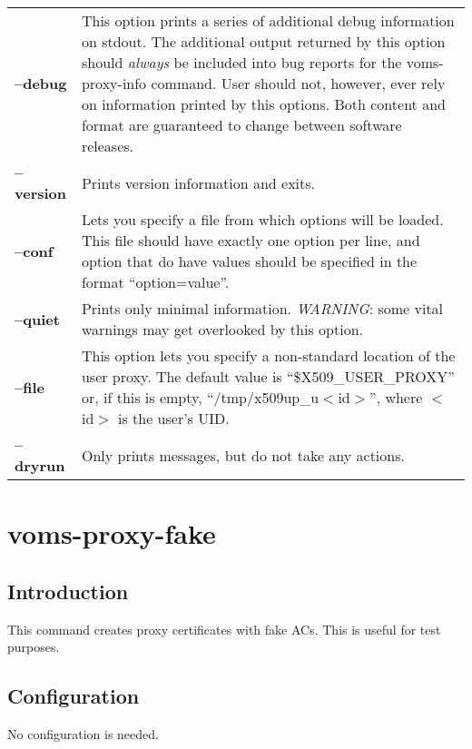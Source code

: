 \documentclass[a4paper]{book}
\begin{document}
\begin{longtable}{lp{3in}}
\textbf{--debug}    & This option prints a series of additional debug
		      information on stdout.  The additional output
		      returned by this option should \emph{always} be
		      included into bug reports for the
		      voms-proxy-info command.  User should not,
		      however, ever rely on information printed by
		      this options.  Both content and format are
		      guaranteed to change between software
		      releases.\\
\textbf{--version}  & Prints version information and exits.\\
\textbf{--conf}     & Lets you specify a file from which options will
		      be loaded.  This file should have exactly one
		      option per line, and option that do have values
		      should be specified in the format
		      ``option=value''.\\ 
\textbf{--quiet}    & Prints only minimal information.
		      \emph{WARNING}: some vital warnings may get
		      overlooked by this option.\\
\textbf{--file}     & This option lets you specify a non-standard
		      location of the user proxy.  The default value
		      is ``\$X509\_USER\_PROXY'' or, if this is empty,
		      ``/tmp/x509up\_u$<$id$>$'', where $<$id$>$ is
		      the user's UID.\\
\textbf{--dryrun}   & Only prints messages, but do not take any
		      actions.\\
\end{longtable}

\chapter{voms-proxy-fake}
\section{Introduction}
This command creates proxy certificates with fake ACs.  This is useful for test
purposes.

\section{Configuration}
No configuration is needed.
\end{document}
